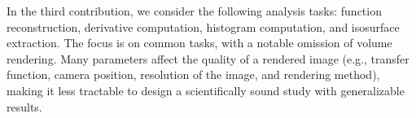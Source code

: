{\color{purple}In the third contribution, we consider the following analysis tasks: function
reconstruction, derivative computation, histogram computation, and isosurface extraction. The focus
is on common tasks, with a notable omission of volume rendering. Many parameters affect the quality
of a rendered image (e.g., transfer function, camera position, resolution of the image, and
rendering method), making it less tractable to design a scientifically sound study with
generalizable results.}

